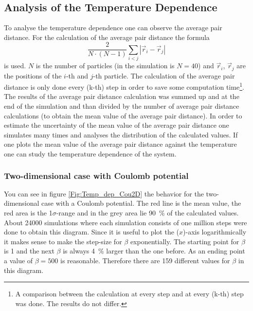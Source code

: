 \documentclass[11pt, a4paper]{article}
\numberwithin{equation}{section}
\newcommand{\remark}[1]{{\color{red}(#1)}}
\begin{document}
\subsection{Analysis of the Temperature Dependence} \label{sec:Temp_Dep}
To analyse the temperature dependence one can observe the average pair distance.
For the calculation of the average pair distance the formula
\begin{equation}
\frac{2}{N \cdot (N - 1)} \sum_{i<j} |\vec{r}_i - \vec{r}_j |
\end{equation}
is used.
$N$ is the number of particles (in the simulation is $N=40$) and $\vec{r}_i$, $\vec{r}_j$ are the positions of the $i$-th and $j$-th particle.
The calculation of the average pair distance is only done every \remark{k-th} step in order to save some computation time\footnote{A comparison between the calculation at every step and at every \remark{k-th} step was done.
The results do not differ.}.
The results of the average pair distance calculation was summed up and at the end of the simulation and than divided by the number of average pair distance calculations (to obtain the mean value of the average pair distance).
In order to estimate the uncertainty of the mean value of the average pair distance one simulates many times and analyses the distribution of the calculated values.
If one plots the mean value of the average pair distance against the temperature one can study the temperature dependence of the system.

\subsubsection{Two-dimensional case with Coulomb potential}
You can see in figure \ref{Fig:Temp_dep_Cou2D} the behavior for the two-dimensional case with a Coulomb potential.
The red line is the mean value, the red area is the 1$\sigma$-range and in the grey area lie \SI{90}{\percent} of the calculated values.
About 24000 simulations where each simulation consists of one million steps were done to obtain this diagram.
Since it is useful to plot the \remark{$x$}-axis logarithmically it makes sense to make the step-size for $\beta$ exponentially.
The starting point for $\beta$ is 1 and the next $\beta$ is always \SI{4}{\percent} larger than the one before.
As an ending point a value of $\beta=500$ is reasonable.
Therefore there are 159 different values for $\beta$ in this diagram.
\end{document}
